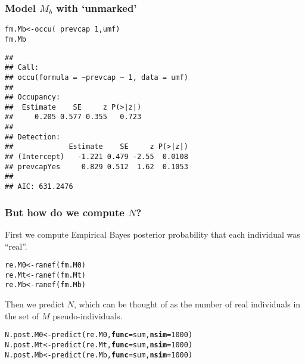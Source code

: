 \documentclass[color=usenames,dvipsnames]{beamer}\usepackage[]{graphicx}\usepackage[]{color}
\makeatletter
\newcommand{\hlnum}[1]{\textcolor[rgb]{0.69,0.494,0}{#1}}%
\newcommand{\hlopt}[1]{\textcolor[rgb]{0,0,0}{#1}}%
\newcommand{\hlstd}[1]{\textcolor[rgb]{0,0,0}{#1}}%
\newcommand{\hlkwb}[1]{\textcolor[rgb]{0,0.341,0.682}{#1}}%
\newcommand{\hlkwc}[1]{\textcolor[rgb]{0,0,0}{\textbf{#1}}}%
\newcommand{\hlkwd}[1]{\textcolor[rgb]{0.004,0.004,0.506}{#1}}%
\newenvironment{kframe}{%
 \def\at@end@of@kframe{}%
 \ifinner\ifhmode%
  \def\at@end@of@kframe{\end{minipage}}%
  \begin{minipage}{\columnwidth}%
 \fi\fi%
 \def\FrameCommand##1{\hskip\@totalleftmargin \hskip-\fboxsep
 \colorbox{shadecolor}{##1}\hskip-\fboxsep
     \hskip-\linewidth \hskip-\@totalleftmargin \hskip\columnwidth}%
 \MakeFramed {\advance\hsize-\width
   \@totalleftmargin\z@ \linewidth\hsize
   \@setminipage}}%
 {\par\unskip\endMakeFramed%
 \at@end@of@kframe}
\newenvironment{knitrout}{}{} %
\makeatother
\begin{document}
\begin{frame}[fragile]
  \frametitle{Model $M_b$ with `unmarked'}
\begin{knitrout}\scriptsize
{}\color{fgcolor}\begin{kframe}
\begin{alltt}
\hlstd{fm.Mb} \hlkwb{<-} \hlkwd{occu}\hlstd{(}\hlopt{~}\hlstd{prevcap}\hlopt{~}\hlnum{1}\hlstd{, umf)}
\hlstd{fm.Mb}
\end{alltt}
\begin{verbatim}
## 
## Call:
## occu(formula = ~prevcap ~ 1, data = umf)
## 
## Occupancy:
##  Estimate    SE     z P(>|z|)
##     0.205 0.577 0.355   0.723
## 
## Detection:
##             Estimate    SE     z P(>|z|)
## (Intercept)   -1.221 0.479 -2.55  0.0108
## prevcapYes     0.829 0.512  1.62  0.1053
## 
## AIC: 631.2476
\end{verbatim}
\end{kframe}
\end{knitrout}
\end{frame}


\begin{frame}[fragile]
  \frametitle{But how do we compute $N$?}
  First we compute Empirical Bayes posterior probability that each
  individual was ``real''. 
\begin{knitrout}\small
{}\color{fgcolor}\begin{kframe}
\begin{alltt}
\hlstd{re.M0} \hlkwb{<-} \hlkwd{ranef}\hlstd{(fm.M0)}
\hlstd{re.Mt} \hlkwb{<-} \hlkwd{ranef}\hlstd{(fm.Mt)}
\hlstd{re.Mb} \hlkwb{<-} \hlkwd{ranef}\hlstd{(fm.Mb)}
\end{alltt}
\end{kframe}
\end{knitrout}
\pause
\vfill
Then we predict $N$, which can be thought of as the number of real
individuals in the set of $M$ pseudo-individuals.
\begin{knitrout}\small
{}\color{fgcolor}\begin{kframe}
\begin{alltt}
\hlstd{N.post.M0} \hlkwb{<-} \hlkwd{predict}\hlstd{(re.M0,} \hlkwc{func}\hlstd{=sum,} \hlkwc{nsim}\hlstd{=}\hlnum{1000}\hlstd{)}
\hlstd{N.post.Mt} \hlkwb{<-} \hlkwd{predict}\hlstd{(re.Mt,} \hlkwc{func}\hlstd{=sum,} \hlkwc{nsim}\hlstd{=}\hlnum{1000}\hlstd{)}
\hlstd{N.post.Mb} \hlkwb{<-} \hlkwd{predict}\hlstd{(re.Mb,} \hlkwc{func}\hlstd{=sum,} \hlkwc{nsim}\hlstd{=}\hlnum{1000}\hlstd{)}
\end{alltt}
\end{kframe}
\end{knitrout}
\end{frame}
\end{document}
